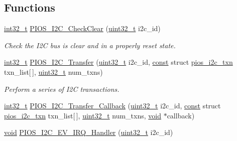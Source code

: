 \subsection*{Functions}
\begin{DoxyCompactItemize}
\item 
\hyperlink{group___n_a_m_e_gafd12020da5a235dfcf0c3c748fb5baed}{int32\-\_\-t} \hyperlink{group___p_i_o_s___i2_c_gaaabd7d33d122ee5c6b33779b1302a84f}{P\-I\-O\-S\-\_\-\-I2\-C\-\_\-\-Check\-Clear} (\hyperlink{stdint_8h_a435d1572bf3f880d55459d9805097f62}{uint32\-\_\-t} i2c\-\_\-id)
\begin{DoxyCompactList}\small\item\em Check the I2\-C bus is clear and in a properly reset state. \end{DoxyCompactList}\item 
\hyperlink{group___n_a_m_e_gafd12020da5a235dfcf0c3c748fb5baed}{int32\-\_\-t} \hyperlink{group___p_i_o_s___i2_c_ga82be0a46a98ad8ed6609e4f2dd27ae46}{P\-I\-O\-S\-\_\-\-I2\-C\-\_\-\-Transfer} (\hyperlink{stdint_8h_a435d1572bf3f880d55459d9805097f62}{uint32\-\_\-t} i2c\-\_\-id, \hyperlink{group___n_a_m_e_ga7ae6d0e43244213b34de2c2b9aa30da6}{const} struct \hyperlink{structpios__i2c__txn}{pios\-\_\-i2c\-\_\-txn} txn\-\_\-list\mbox{[}$\,$\mbox{]}, \hyperlink{stdint_8h_a435d1572bf3f880d55459d9805097f62}{uint32\-\_\-t} num\-\_\-txns)
\begin{DoxyCompactList}\small\item\em Perform a series of I2\-C transactions. \end{DoxyCompactList}\item 
\hyperlink{group___n_a_m_e_gafd12020da5a235dfcf0c3c748fb5baed}{int32\-\_\-t} \hyperlink{group___p_i_o_s___i2_c_ga29a3d795901b2ad013a11454cd587e57}{P\-I\-O\-S\-\_\-\-I2\-C\-\_\-\-Transfer\-\_\-\-Callback} (\hyperlink{stdint_8h_a435d1572bf3f880d55459d9805097f62}{uint32\-\_\-t} i2c\-\_\-id, \hyperlink{group___n_a_m_e_ga7ae6d0e43244213b34de2c2b9aa30da6}{const} struct \hyperlink{structpios__i2c__txn}{pios\-\_\-i2c\-\_\-txn} txn\-\_\-list\mbox{[}$\,$\mbox{]}, \hyperlink{stdint_8h_a435d1572bf3f880d55459d9805097f62}{uint32\-\_\-t} num\-\_\-txns, \hyperlink{group___n_a_m_e_ga18028b8badbf1ea7e704ccac3c488e82}{void} $\ast$callback)
\item 
\hyperlink{group___n_a_m_e_ga18028b8badbf1ea7e704ccac3c488e82}{void} \hyperlink{group___p_i_o_s___i2_c_ga779ac2da156f2d9720d8e526bf05edb4}{P\-I\-O\-S\-\_\-\-I2\-C\-\_\-\-E\-V\-\_\-\-I\-R\-Q\-\_\-\-Handler} (\hyperlink{stdint_8h_a435d1572bf3f880d55459d9805097f62}{uint32\-\_\-t} i2c\-\_\-id)

\end{DoxyCompactItemize}
